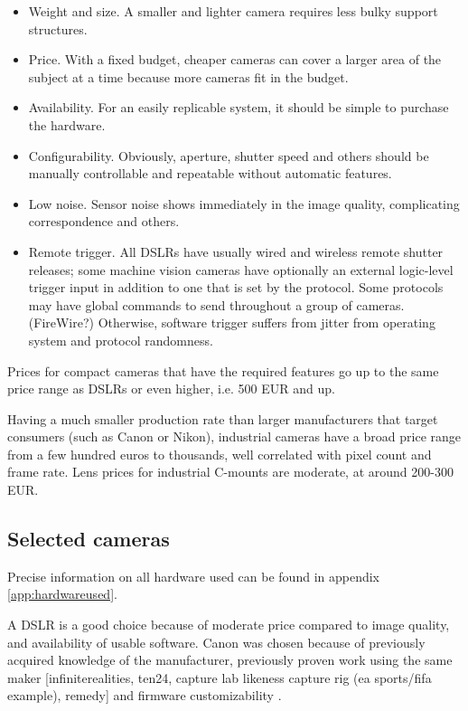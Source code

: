 \begin{itemize}
\item Weight and size. A smaller and lighter camera requires less bulky support structures.
\item Price. With a fixed budget, cheaper cameras can cover a larger area of the subject at a time because more cameras fit in the budget.
\item Availability. For an easily replicable system, it should be simple to purchase the hardware.
\item Configurability. Obviously, aperture, shutter speed and others should be manually controllable and repeatable without automatic features.
\item Low noise. Sensor noise shows immediately in the image quality, complicating correspondence and others.
\item Remote trigger. All DSLRs have usually wired and wireless remote shutter releases; some machine vision cameras have optionally an external logic-level trigger input in addition to one that is set by the protocol. Some protocols may have global commands to send throughout a group of cameras. (FireWire?) Otherwise, software trigger suffers from jitter from operating system and protocol randomness.
\end{itemize}

Prices for compact cameras that have the required features go up to the same price range as DSLRs or even higher, i.e. 500 EUR and up.

Having a much smaller production rate than larger manufacturers that target consumers (such as Canon or Nikon), industrial cameras have a broad price range from a few hundred euros to thousands, well correlated with pixel count and frame rate.
Lens prices for industrial C-mounts are moderate, at around 200-300 EUR.


\subsection{Selected cameras} %

Precise information on all hardware used can be found in appendix \ref{app:hardwareused}.

A DSLR is a good choice because of moderate price compared to image quality, and availability of usable software.
Canon was chosen because of previously acquired knowledge of the manufacturer, previously proven work using the same maker [infiniterealities, ten24, capture lab likeness capture rig (ea sports/fifa example), remedy] and firmware customizability \cite{magiclantern}. %

